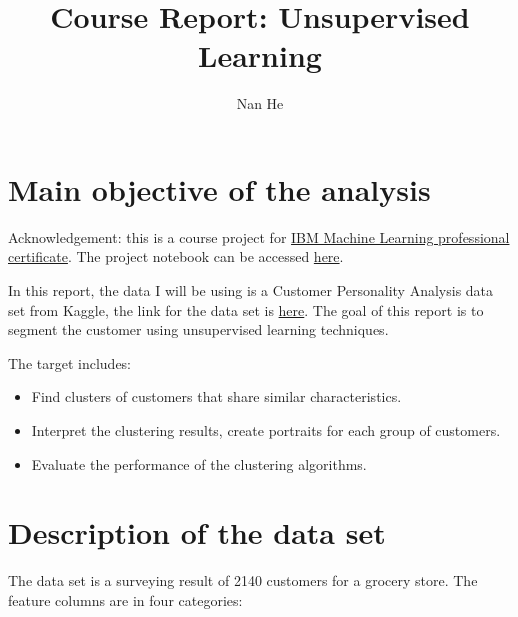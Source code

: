 \documentclass[11pt]{article}
\title{Course Report: Unsupervised Learning}
\author{Nan He}
\date{}
\begin{document}
\maketitle


\section{Main objective of the analysis}\label{section-introduction-1}
Acknowledgement: this is a course project for \href{https://www.coursera.org/professional-certificates/ibm-machine-learning}{IBM Machine Learning professional certificate}. The project notebook can be accessed \href{https://github.com/henankf223/Assignment-4-clustering/blob/78e68a214d2f9d0cd1f26b3230c74a71f61e4493/clustering_assignment.ipynb}{here}.

In this report, the data I will be using is a Customer Personality Analysis data set from Kaggle, the link for the data set is \href{https://www.kaggle.com/imakash3011/customer-personality-analysis}{here}.
The goal of this report is to segment the customer using unsupervised learning techniques. 

The target includes: 

\begin{itemize}
\item Find clusters of customers that share similar characteristics.
\item Interpret the clustering results, create portraits for each group of customers.
\item Evaluate the performance of the clustering algorithms.
\end{itemize}

\section{Description of the data set}\label{section-introduction-2}
The data set is a surveying result of 2140 customers for a grocery store. 
The feature columns are in four categories:
\end{document}
